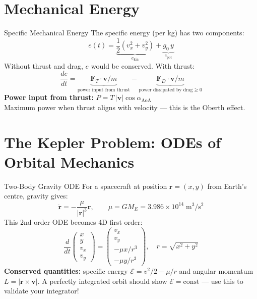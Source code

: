 \documentclass[12pt, a4paper]{article}
\begin{document}
\section{Mechanical Energy}

\begin{theorybox}{Specific Mechanical Energy}
The specific energy (per kg) has two components:
\[
  e(t) = \underbrace{\frac{1}{2}(v_x^2 + v_y^2)}_{e_\text{kin}} + \underbrace{g_0\,y}_{e_\text{pot}}
\]
Without thrust and drag, $e$ would be conserved. With thrust:
\[
  \frac{de}{dt} = \underbrace{\mathbf{F}_T \cdot \mathbf{v} / m}_{\text{power input from thrust}} - \underbrace{\mathbf{F}_D \cdot \mathbf{v} / m}_{\text{power dissipated by drag} \geq 0}
\]
\textbf{Power input from thrust:} $P = T\,|\mathbf{v}|\cos\alpha_\text{AoA}$\\
Maximum power when thrust aligns with velocity — this is the Oberth effect.
\end{theorybox}

\section{The Kepler Problem: ODEs of Orbital Mechanics}

\begin{theorybox}{Two-Body Gravity ODE}
For a spacecraft at position $\mathbf{r} = (x,y)$ from Earth's centre, gravity gives:
\[
  \ddot{\mathbf{r}} = -\frac{\mu}{|\mathbf{r}|^3}\mathbf{r}, \qquad \mu = G M_E = 3.986\times 10^{14}\;\text{m}^3/\text{s}^2
\]
This 2nd order ODE becomes 4D first order:
\[
  \frac{d}{dt}\begin{pmatrix}x\\y\\v_x\\v_y\end{pmatrix}
  = \begin{pmatrix}v_x\\v_y\\-\mu x/r^3\\-\mu y/r^3\end{pmatrix}, \quad r = \sqrt{x^2+y^2}
\]
\textbf{Conserved quantities:} specific energy $\mathcal{E} = v^2/2 - \mu/r$ and angular momentum $L = |\mathbf{r}\times\mathbf{v}|$.
A perfectly integrated orbit should show $\mathcal{E} = \text{const}$ — use this to validate your integrator!
\end{theorybox}
\end{document}
